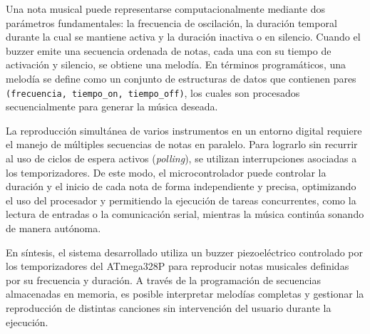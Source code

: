 \vspace{1em}

Una nota musical puede representarse computacionalmente mediante dos parámetros fundamentales: la frecuencia de oscilación, la duración temporal durante la cual se mantiene activa y la duración inactiva o en silencio. Cuando el buzzer emite una secuencia ordenada de notas, cada una con su tiempo de activación y silencio, se obtiene una melodía. En términos programáticos, una melodía se define como un conjunto de estructuras de datos que contienen pares \texttt{(frecuencia, tiempo\_on, tiempo\_off)}, los cuales son procesados secuencialmente para generar la música deseada.

\vspace{1em}

La reproducción simultánea de varios instrumentos en un entorno digital requiere el manejo de múltiples secuencias de notas en paralelo. Para lograrlo sin recurrir al uso de ciclos de espera activos (\textit{polling}), se utilizan interrupciones asociadas a los temporizadores. De este modo, el microcontrolador puede controlar la duración y el inicio de cada nota de forma independiente y precisa, optimizando el uso del procesador y permitiendo la ejecución de tareas concurrentes, como la lectura de entradas o la comunicación serial, mientras la música continúa sonando de manera autónoma.

\vspace{1em}

En síntesis, el sistema desarrollado utiliza un buzzer piezoeléctrico controlado por los temporizadores del ATmega328P para reproducir notas musicales definidas por su frecuencia y duración. A través de la programación de secuencias almacenadas en memoria, es posible interpretar melodías completas y gestionar la reproducción de distintas canciones sin intervención del usuario durante la ejecución.




